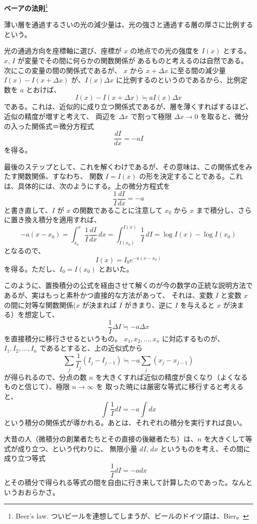 \documentclass[a4paper]{jsarticle}
\theoremstyle{definition}
\theoremstyle{remark}
\begin{document}
\bigskip
\noindent
\textbf{ベーアの法則}\footnote{Beer's law. ついビールを連想してしまうが、ビールのドイツ語は、Bier。}

薄い層を通過するさいの光の減少量は、光の強さと通過する層の厚さに比例するという。

光の通過方向を座標軸に選び、座標が $x$ の地点での光の強度を $I(x)$ とする。$x$, $I$ が変量でその間に何らかの関数関係が
あるものと考えるのは自然である。
次にこの変量の間の関係式であるが、
$x$ から $x + \Delta x$ に至る間の減少量
$I(x) - I(x+\Delta x)$ が、$I(x)\Delta x$ に比例するのというのであるから、比例定数を $a$ とおけば、
\[
I(x) - I(x+\Delta x) \fallingdotseq aI(x)\Delta x
\]
である。これは、近似的に成り立つ関係式であるが、層を薄くすればするほど、近似の精度が増すと考えて、
両辺を $\Delta x$ で割って極限 $\Delta x \to 0$ を取ると、微分の入った関係式＝微分方程式
\[
\frac{dI}{dx} = -a I
\]
を得る。

最後のステップとして、これを解くわけであるが、その意味は、この関係式をみたす関数関係、すなわち、
関数 $I = I(x)$ の形を決定することである。これは、具体的には、次のようにする。上の微分方程式を
\[
\frac{1}{I} \frac{dI}{dx} = -a
\]
と書き直して、$I$ が $x$ の関数であることに注意して $x_0$ から $x$ まで積分し、さらに置き換え積分を適用すれば、
\[
-a (x-x_0) = \int_{x_0}^x \frac{1}{I}\frac{dI}{dx}\, dx 
= \int_{I(x_0)}^{I(x)} \frac{1}{I}\, dI = \log I(x) -\log I(x_0)
\]
となるので、
\[
I(x) = I_0 e^{-a(x-x_0)} 
\]
を得る。ただし、$I_0 = I(x_0)$ とおいた。

このように、置換積分の公式を経由させて解くのが今の数学の正統な説明方法であるが、実はもっと素朴かつ直接的な方法があって、
それは、変数 $I$ と変数 $x$ の間に対等な関数関係($x$ が決まれば $I$ がきまり、逆に $I$ を与えると 
$x$ が決まる）を想定して、
\[
\frac{1}{I} \Delta I \fallingdotseq -a \Delta x
\]
を直接積分に移行させるというもの。
$x_1, x_2, \dots, x_n$ に対応するものが、$I_1, I_2, \dots, I_n$ であるとすると、上の近似式から
\[
\sum_j \frac{1}{I_j} (I_j - I_{j-1}) \fallingdotseq - a\sum_j (x_j - x_{j-1}) 
\]
が得られるので、分点の数 $n$ を大きくすれば近似の精度が良くなり（よくなるものと信じて）、極限 $n \to \infty$ を
取った暁には厳密な等式に移行すると考えると、
\[
\int \frac{1}{I}dI = -a \int dx
\]
という積分の関係式が導かれる。あとは、それぞれの積分を実行すれば良い。

大昔の人（微積分の創業者たちとその直接の後継者たち）は、$n$ を大きくして等式が成り立つ、という代わりに、
無限小量 $dI$, $dx$ というものを考え、その間に成り立つ等式
\[
\frac{1}{I}dI = -adx 
\]
とその積分で得られる等式の間を自由に行き来して計算したのであった。なんというおおらかさ。
\end{document}
